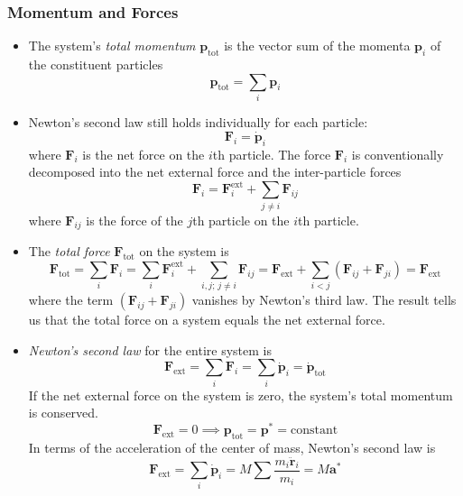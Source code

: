 \documentclass[11pt, a4paper]{article}
\newcommand{\bdot}[1]{\dot{\bm{#1}}}
\newcommand{\bddot}[1]{\ddot{\bm{#1}}}
\begin{document}
\subsubsection{Momentum and Forces}
\begin{itemize}

	\item The system's \textit{total momentum} $ \bm{p}_{\text{tot}} $ is the vector sum of the momenta $ \bm{p}_{i} $ of the constituent particles
	\begin{equation*}
		\bm{p}_{\text{tot}} = \sum_{i} \bm{p}_{i}
	\end{equation*}
	
	\item Newton's second law still holds individually for each particle:
	\begin{equation*}
		\bm{F}_{i} = \bdot{p}_{i}
	\end{equation*}
	where $ \bm{F}_{i} $ is the net force on the $ i $th particle. The force $ \bm{F}_{i} $ is conventionally decomposed into the net external force and the inter-particle forces
	\begin{equation*}
		\bm{F}_{i} = \bm{F}_{i}^{\text{ext}} + \sum_{j \neq i} \bm{F}_{ij}
	\end{equation*}
	where $ \bm{F}_{ij} $ is the force of the $ j $th particle on the $ i $th particle.
	
	\item The \textit{total force} $ \bm{F}_{\text{tot}} $ on the system is
	\begin{equation*}
		\bm{F}_{\text{tot}} = \sum_{i} \bm{F}_{i} = \sum_{i} \bm{F}_{i}^{\text{ext}} + \sum_{i,j;\, j \neq i} \bm{F}_{ij} = \bm{F}_{\text{ext}} + \sum_{i < j} (\bm{F}_{ij} + \bm{F}_{ji}) = \bm{F}_{\text{ext}}
	\end{equation*}
	where the term $ (\bm{F}_{ij} + \bm{F}_{ji})  $ vanishes by Newton's third law. The result tells us that the total force on a system equals the net external force. 
	
	\item \textit{Newton's second law} for the entire system is
	\begin{equation*}
		\bm{F}_{\text{ext}} = \sum_{i} \bm{F}_{i} = \sum_{i} \bdot{p}_{i} = \bdot{p}_{\text{tot}}
	\end{equation*}
	If the net external force on the system is zero, the system's total momentum is conserved.
	\begin{equation*}
		\bm{F}_{\text{ext}} = 0 \implies \bm{p}_{\text{tot}} = \bm{p}^{*} = \text{constant}
	\end{equation*}
	In terms of the acceleration of the center of mass, Newton's second law is
	\begin{equation*}
		\bm{F}_{\text{ext}} = \sum_{i} \bdot{p}_{i} = M \sum \frac{m_{i}\bddot{r}_{i}}{m_{i}}= M \bm{a}^{*}
	\end{equation*}

\end{itemize}
\end{document}
